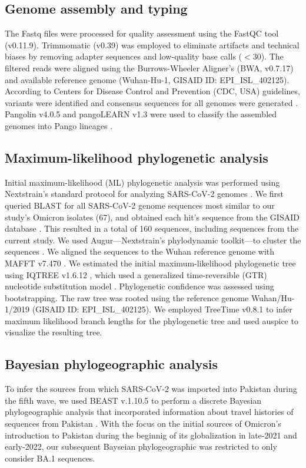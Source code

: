 \subsection{Genome assembly and typing}\label{2:mm-assembly}
The Fastq files were processed for quality assessment using the FastQC tool (v0.11.9)\cite{andrews2010fastqc}.
Trimmomatic (v0.39) \cite{bolger2014trimmomatic} was employed to eliminate artifacts and technical biases by removing adapter sequences and low-quality base calls ($<30$).
The filtered reads were aligned using the Burrows-Wheeler Aligner's (BWA, v0.7.17) \cite{li2010fast} and available reference genome (Wuhan-Hu-1, GISAID ID: EPI\_ISL\_402125).
According to Centers for Disease Control and Prevention (CDC, USA) guidelines, variants were identified and consensus sequences for all genomes were generated \cite{paden2020rapid}.
Pangolin v4.0.5 and pangoLEARN v1.3 were used to classify the assembled genomes into Pango lineages \cite{o2021assignment}.


\subsection{Maximum-likelihood phylogenetic analysis}\label{2:mm-ml}
Initial maximum-likelihood (ML) phylogenetic analysis was performed using Nextstrain's standard protocol for analyzing SARS-CoV-2 genomes \cite{hadfield2018nextstrain}.
We first queried BLAST for all SARS-CoV-2 genome sequences most similar to our study's Omicron isolates (67), and obtained each hit's sequence from the GISAID database \cite{shu2017gisaid}. 
This resulted in a total of 160 sequences, including sequences from the current study. 
We used Augur---Nextstrain's phylodynamic toolkit---to cluster the sequences \cite{huddleston2021augur}.
We aligned the sequences to the Wuhan reference genome with MAFFT v7.470 \cite{katoh2002mafft}.
We estimated the initial maximum-likelihood phylogenetic tree using IQTREE v1.6.12 \cite{nguyen2015iq}, which used a generalized time-reversible (GTR) nucleotide substitution model \cite{tavare1986some, yang1994estimating, zharkikh1994estimation}.
Phylogenetic confidence was assessed using bootstrapping.
The raw tree was rooted using the reference genome Wuhan/Hu-1/2019 (GISAID ID: EPI\_ISL\_402125).
We employed TreeTime v0.8.1 to infer maximum likelihood branch lengths for the phylogenetic tree \cite{sagulenko2018treetime} and used auspice \cite{hadfield2018nextstrain} to visualize the resulting tree.


\subsection{Bayesian phylogeographic analysis}\label{2:mm-beast}
To infer the sources from which SARS-CoV-2 was imported into Pakistan during the fifth wave, we used BEAST v.1.10.5 \cite{suchard2018bayesian} to perform a discrete Bayesian phylogeographic analysis \cite{lemey2009bayesian} that incorporated information about travel histories of sequences from Pakistan \cite{lemey2020accommodating}.
With the focus on the initial sources of Omicron's introduction to Pakistan during the beginnig of its globalization in late-2021 and early-2022, our subsequent Bayseian phylogeographic was restricted to only consider BA.1 sequences.

